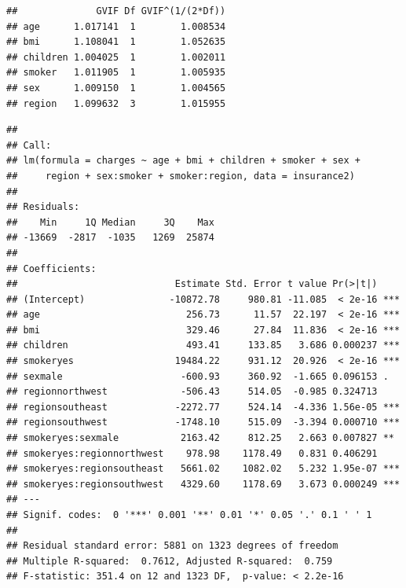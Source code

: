 \documentclass[
  12pt,
]{article}
\begin{document}
\begin{verbatim}
##              GVIF Df GVIF^(1/(2*Df))
## age      1.017141  1        1.008534
## bmi      1.108041  1        1.052635
## children 1.004025  1        1.002011
## smoker   1.011905  1        1.005935
## sex      1.009150  1        1.004565
## region   1.099632  3        1.015955
\end{verbatim}

\begin{verbatim}
## 
## Call:
## lm(formula = charges ~ age + bmi + children + smoker + sex + 
##     region + sex:smoker + smoker:region, data = insurance2)
## 
## Residuals:
##    Min     1Q Median     3Q    Max 
## -13669  -2817  -1035   1269  25874 
## 
## Coefficients:
##                            Estimate Std. Error t value Pr(>|t|)    
## (Intercept)               -10872.78     980.81 -11.085  < 2e-16 ***
## age                          256.73      11.57  22.197  < 2e-16 ***
## bmi                          329.46      27.84  11.836  < 2e-16 ***
## children                     493.41     133.85   3.686 0.000237 ***
## smokeryes                  19484.22     931.12  20.926  < 2e-16 ***
## sexmale                     -600.93     360.92  -1.665 0.096153 .  
## regionnorthwest             -506.43     514.05  -0.985 0.324713    
## regionsoutheast            -2272.77     524.14  -4.336 1.56e-05 ***
## regionsouthwest            -1748.10     515.09  -3.394 0.000710 ***
## smokeryes:sexmale           2163.42     812.25   2.663 0.007827 ** 
## smokeryes:regionnorthwest    978.98    1178.49   0.831 0.406291    
## smokeryes:regionsoutheast   5661.02    1082.02   5.232 1.95e-07 ***
## smokeryes:regionsouthwest   4329.60    1178.69   3.673 0.000249 ***
## ---
## Signif. codes:  0 '***' 0.001 '**' 0.01 '*' 0.05 '.' 0.1 ' ' 1
## 
## Residual standard error: 5881 on 1323 degrees of freedom
## Multiple R-squared:  0.7612, Adjusted R-squared:  0.759 
## F-statistic: 351.4 on 12 and 1323 DF,  p-value: < 2.2e-16
\end{verbatim}
\end{document}
